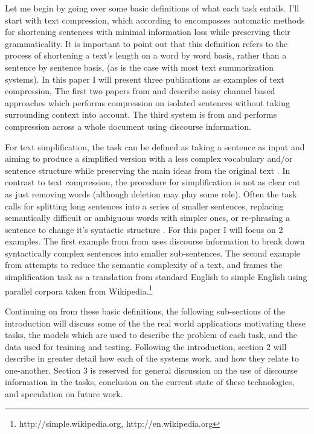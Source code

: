 {Let me begin by going over some basic definitions of what each task entails.  I'll start with text compression, which according to \citet{Clarke:2010:DCD:1950488.1950493} encompasses automatic methods for shortening sentences with minimal information loss while preserving their grammaticality.  It is important to point out that this definition refers to the process of shortening a text's length on a word by word basis, rather than a sentence by sentence basis, (as is the case with most text summarization systems). In this paper I will present three publications as examples of text compression,  The first two papers from \citet{knight2000statistics} and \citet{galley2007lexicalized} describe noisy channel based approaches  which performs compression on isolated sentences without taking surrounding context into account.  The third system is from \citet{Clarke:2010:DCD:1950488.1950493} and performs compression across a whole document using discourse information.  

{For text simplification, the task can be defined as taking a sentence as input and aiming to produce a simplified version with a less complex vocabulary and/or sentence structure while preserving the main ideas from the original text \citep{Feng2008}.  In contrast to text compression, the procedure for simplification is not as clear cut as just removing words (although deletion may play some role). Often the task calls for splitting long sentences into a series of smaller sentences, replacing semantically difficult or ambiguous words with simpler ones, or re-phrasing a sentence to change it's syntactic structure \citep{coster-kauchak:2011:T2TW-2011}.  For this paper I will focus on 2 examples. The first example from from \citet{Siddharthan2006} uses discourse information to break down syntactically complex sentences into smaller sub-sentences.  The second example from \citet{coster-kauchak:2011:T2TW-2011} attempts to reduce the semantic complexity of a text, and frames the simplification task as a translation from standard English to simple English using parallel corpora taken from Wikipedia.\footnote{http://simple.wikipedia.org,	http://en.wikipedia.org}}


{Continuing on from these basic definitions, the following sub-sections of the introduction will discuss some of the the real world applications motivating these tasks, the models which are used to describe the problem of each task, and the data used for training and testing.  Following the introduction, section 2 will describe in greater detail how each of the systems work, and how they relate to one-another. Section 3 is reserved for general discussion on the use of discourse information in the tasks, conclusion on the current state of these technologies, and speculation on future work.}


}
